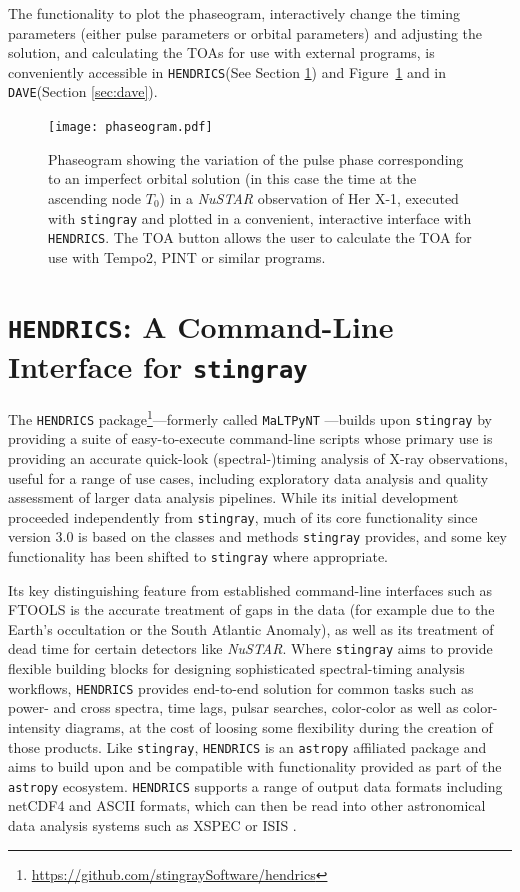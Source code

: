 \documentclass[twocolumn]{aastex62}
\newcommand{\project}[1]{\textsl{#1}\xspace}
\newcommand{\nustar}{\project{NuSTAR}\xspace}
\newcommand{\stingray}{\texttt{stingray}\xspace}
\newcommand{\astropy}{\texttt{astropy}\xspace}
\newcommand{\hendrics}{\texttt{HENDRICS}\xspace}
\newcommand{\dave}{\texttt{DAVE}\xspace}
\begin{document}
The functionality to plot the phaseogram, interactively change the timing parameters (either pulse parameters or orbital parameters) and adjusting the solution, and calculating the TOAs for use with external programs, is conveniently accessible in \hendrics (See Section \ref{sec:hendrics}) and Figure~\ref{fig:phaseogram} and in \dave (Section \ref{sec:dave}).

\begin{figure}[htbp]
\begin{center}
\texttt{[image: phaseogram.pdf]}
\caption{Phaseogram showing the variation of the pulse phase corresponding to an imperfect orbital solution (in this case the time at the ascending node $T_0$) in a \nustar observation of Her X-1, executed with \stingray and plotted in a convenient, interactive interface with \hendrics. 
The TOA button allows the user to calculate the TOA for use with Tempo2, PINT or similar programs.}
\label{fig:phaseogram}
\end{center}
\end{figure}

\section{\hendrics: A Command-Line Interface for \stingray}
\label{sec:hendrics}

The \hendrics package\footnote{\url{https://github.com/stingraySoftware/hendrics}}---formerly called \texttt{MaLTPyNT} \citep{bachetti2015b}---builds upon \stingray by providing a suite of easy-to-execute command-line scripts whose primary use is providing an accurate quick-look (spectral-)timing analysis of X-ray observations, useful for a range of use cases, including exploratory data analysis and quality assessment of larger data analysis pipelines. 
While its initial development proceeded independently from \stingray, much of its core functionality since version 3.0 is based on the classes and methods \stingray provides, and some key functionality has been shifted to \stingray where appropriate. 

Its key distinguishing feature from established command-line interfaces such as FTOOLS is the accurate treatment of gaps in the data (for example due to the Earth's occultation or the South Atlantic Anomaly), as well as its treatment of dead time for certain detectors like \nustar. 
Where \stingray aims to provide flexible building blocks for designing sophisticated spectral-timing analysis workflows, \hendrics provides end-to-end solution for common tasks such as power- and cross spectra, time lags, pulsar searches, color-color as well as color-intensity diagrams, at the cost of loosing some flexibility during the creation of those products. 
Like \stingray, \hendrics is an \astropy affiliated package and aims to build upon and be compatible with functionality provided as part of the \astropy ecosystem.
\hendrics supports a range of output data formats including netCDF4 and ASCII formats, which can then be read into other astronomical data analysis systems such as XSPEC \citep{arnaud1996} or ISIS  \citep{houck2000}.
\end{document}
